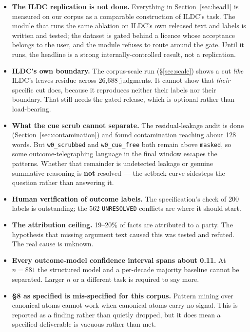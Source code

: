 \documentclass[12pt,a4paper]{article}
\newcommand{\code}[1]{\texttt{\small #1}}
\begin{document}
\begin{itemize}
\item \textbf{The ILDC replication is not done.} Everything in Section~\ref{sec:head1} is measured on
our corpus as a comparable construction of ILDC's task. The module that runs the same ablation on
ILDC's own released text and labels is written and tested; the dataset is gated behind a licence whose
acceptance belongs to the user, and the module refuses to route around the gate. Until it runs, the
headline is a strong internally-controlled result, not a replication.
\item \textbf{ILDC's own boundary.} The corpus-scale run (§\ref{sec:scale}) shows a cut
\emph{like} ILDC's leaves residue across 26,688 judgments. It cannot show that \emph{their} specific
cut does, because it reproduces neither their labels nor their boundary. That still needs the gated
release, which is optional rather than load-bearing.
\item \textbf{What the cue scrub cannot separate.} The residual-leakage audit is done
(Section~\ref{sec:contamination}) and found contamination reaching about 128 words. But
\code{w0\_scrubbed} and \code{w0\_cue\_free} both remain above \code{masked}, so some
outcome-telegraphing language in the final window escapes the patterns. Whether that remainder is
undetected leakage or genuine summative reasoning is \textbf{not} resolved --- the setback curve
sidesteps the question rather than answering it.
\item \textbf{Human verification of outcome labels.} The specification's check of 200 labels is
outstanding; the 562 \code{UNRESOLVED} conflicts are where it should start.
\item \textbf{The attribution ceiling.} 19--20\% of facts are attributed to a party. The hypothesis
that missing argument text caused this was tested and refuted. The real cause is unknown.
\item \textbf{Every outcome-model confidence interval spans about 0.11.} At $n=881$ the structured
model and a per-decade majority baseline cannot be separated. Larger $n$ or a different task is
required to say more.
\item \textbf{§8 as specified is mis-specified for this corpus.} Pattern mining over canonical atoms
cannot work when canonical atoms carry no signal. This is reported as a finding rather than quietly
dropped, but it does mean a specified deliverable is vacuous rather than met.
\end{itemize}
\end{document}
